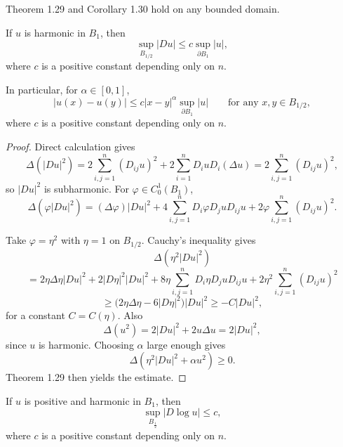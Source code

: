 \begin{remark}\label{hanlin:remark-maxprin-domain}
Theorem 1.29 and Corollary 1.30 hold on any bounded domain.
\end{remark}

\begin{theorem}\label{hanlin:thm-interior-gradient}
If $u$ is harmonic in $B_1$, then
\[
\sup_{B_{1/2}} |Du| \le c\sup_{\partial B_1} |u|,
\]
where $c$ is a positive constant depending only on $n$.
\end{theorem}

In particular, for $\alpha\in[0,1]$,
\[
|u(x)-u(y)| \le c|x-y|^\alpha \sup_{\partial B_1} |u| \qquad \text{for any } x,y \in B_{1/2},
\]
where $c$ is a positive constant depending only on $n$.

\begin{proof}
\sketch Direct calculation gives
\[
\Delta(|Du|^2) = 2\sum_{i,j=1}^n (D_{ij}u)^2 + 2\sum_{i=1}^n D_i u D_i(\Delta u) = 2\sum_{i,j=1}^n (D_{ij}u)^2,
\]
so $|Du|^2$ is subharmonic. For $\varphi\in C_0^1(B_1)$,
\[
\Delta(\varphi|Du|^2) = (\Delta\varphi)|Du|^2 + 4\sum_{i,j=1}^n D_i\varphi D_j u D_{ij}u + 2\varphi\sum_{i,j=1}^n (D_{ij}u)^2.
\]

Take $\varphi=\eta^2$ with $\eta=1$ on $B_{1/2}$. Cauchy's inequality gives
\[
\Delta(\eta^2|Du|^2)
\]
\[
=2\eta \Delta\eta |Du|^2 + 2|D\eta|^2|Du|^2 + 8\eta \sum_{i,j=1}^n D_i\eta D_j u D_{ij}u + 2\eta^2 \sum_{i,j=1}^n (D_{ij}u)^2
\]
\[
\ge \bigl(2\eta\Delta\eta - 6|D\eta|^2\bigr)|Du|^2 \ge -C|Du|^2,
\]
for a constant $C=C(\eta)$. Also
\[
\Delta(u^2) = 2|Du|^2 + 2u\Delta u = 2|Du|^2,
\]
since $u$ is harmonic. Choosing $\alpha$ large enough gives
\[
\Delta(\eta^2|Du|^2 + \alpha u^2) \ge 0.
\]
Theorem 1.29 then yields the estimate.
\end{proof}

\begin{lemma}\label{hanlin:lemma-log-gradient}
If $u$ is positive and harmonic in $B_1$, then
\[
\sup_{B_{\frac{1}{2}}} |D \log u| \le c,
\]
where $c$ is a positive constant depending only on $n$.
\end{lemma}

